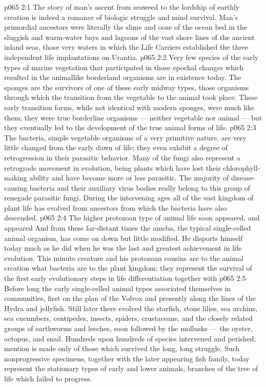 \vs p065 2:1 The story of man’s ascent from seaweed to the lordship of earthly creation is indeed a romance of biologic struggle and mind survival. Man’s primordial ancestors were literally the slime and ooze of the ocean bed in the sluggish and warm\hyp{}water bays and lagoons of the vast shore lines of the ancient inland seas, those very waters in which the Life Carriers established the three independent life implantations on Urantia.
\vs p065 2:2 Very few species of the early types of marine vegetation that participated in those epochal changes which resulted in the animallike borderland organisms are in existence today. The sponges are the survivors of one of these early midway types, those organisms through which the  transition from the vegetable to the animal took place. These early transition forms, while not identical with modern sponges, were much like them; they were true borderline organisms --- neither vegetable nor animal --- but they eventually led to the development of the true animal forms of life.
\vs p065 2:3 The bacteria, simple vegetable organisms of a very primitive nature, are very little changed from the early dawn of life; they even exhibit a degree of retrogression in their parasitic behavior. Many of the fungi also represent a retrograde movement in evolution, being plants which have lost their chlorophyll\hyp{}making ability and have become more or less parasitic. The majority of disease\hyp{}causing bacteria and their auxiliary virus bodies really belong to this group of renegade parasitic fungi. During the intervening ages all of the vast kingdom of plant life has evolved from ancestors from which the bacteria have also descended.
\vs p065 2:4 The higher protozoan type of animal life soon appeared, and appeared  And from these far\hyp{}distant times the ameba, the typical single\hyp{}celled animal organism, has come on down but little modified. He disports himself today much as he did when he was the last and greatest achievement in life evolution. This minute creature and his protozoan cousins are to the animal creation what bacteria are to the plant kingdom; they represent the survival of the first early evolutionary steps in life differentiation together with 
\vs p065 2:5 Before long the early single\hyp{}celled animal types associated themselves in communities, first on the plan of the Volvox and presently along the lines of the Hydra and jellyfish. Still later there evolved the starfish, stone lilies, sea urchins, sea cucumbers, centipedes, insects, spiders, crustaceans, and the closely related groups of earthworms and leeches, soon followed by the mollusks --- the oyster, octopus, and snail. Hundreds upon hundreds of species intervened and perished; mention is made only of those which survived the long, long struggle. Such nonprogressive specimens, together with the later appearing fish family, today represent the stationary types of early and lower animals, branches of the tree of life which failed to progress.

